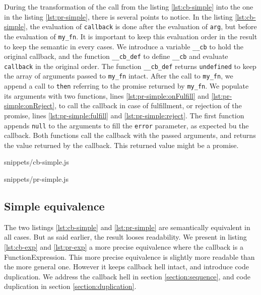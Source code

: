 During the transformation of the call from the listing \ref{lst:cb-simple} into the one in the listing \ref{lst:pr-simple}, there is several points to notice.
In the listing \ref{lst:cb-simple}, the evaluation of \texttt{callback} is done after the evaluation of \texttt{arg}, but before the evaluation of \texttt{my_fn}.
It is important to keep this evaluation order in the result to keep the semantic in every cases.
We introduce a variable \texttt{__cb} to hold the original callback, and the function \texttt{__cb_def} to define \texttt{__cb} and evaluate \texttt{callback} in the original order.
The function \texttt{__cb_def} returns \texttt{undefined} to keep the array of arguments passed to \texttt{my_fn} intact.
After the call to \texttt{my_fn}, we append a call to \texttt{then} referring to the promise returned by \texttt{my_fn}.
We populate its arguments with two functions, lines \ref{lst:pr-simple:onFulfill} and \ref{lst:pr-simple:onReject}, to call the callback in case of fulfillment, or rejection of the promise, lines \ref{lst:pr-simple:fulfill} and \ref{lst:pr-simple:reject}.
The first function appends \texttt{null} to the arguments to fill the \texttt{error} parameter, as expected bu the callback.
Both functions call the callback with the passed arguments, and returns the value returned by the callback.
This returned value might be a promise.

             {snippets/cb-simple.js}

             {snippets/pr-simple.js}

\subsection{Simple equivalence} \label{section:simple}

The two listings \ref{lst:cb-simple} and \ref{lst:pr-simple} are semantically equivalent in all cases.
But as said earlier, the result looses readability.
We present in listing \ref{lst:cb-exp} and \ref{lst:pr-exp} a more precise equivalence where the callback is a FunctionExpression.
This more precise equivalence is slightly more readable than the more general one.
However it keeps callback hell intact, and introduce code duplication.
We address the callback hell in section \ref{section:sequence}, and code duplication in section \ref{section:duplication}.

